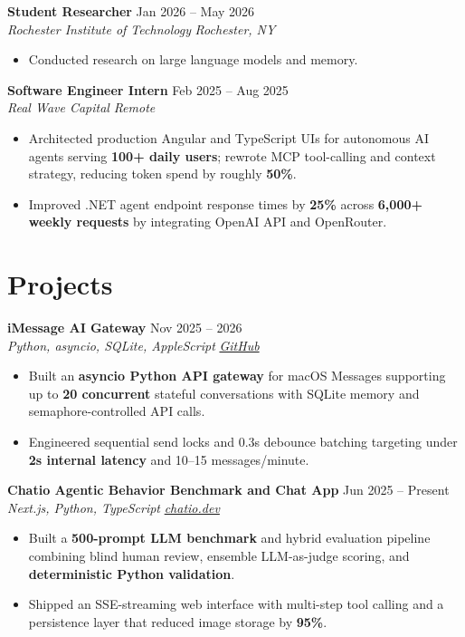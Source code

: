 \documentclass[10pt,letterpaper]{article}
\newcommand{\resumeRole}[4]{%
  \textbf{#1} \hfill #2\\
  \textit{#3} \hfill \textit{#4}
}
\newcommand{\majorGap}{\vspace{1pt plus 2fill}}
\newcommand{\entryGap}{\vspace{0pt plus 1fill}}
\begin{document}
\entryGap
\resumeRole{Student Researcher}{Jan 2026 -- May 2026}{Rochester Institute of Technology}{Rochester, NY}
\begin{itemize}
  \item Conducted research on large language models and memory.
\end{itemize}

\entryGap
\resumeRole{Software Engineer Intern}{Feb 2025 -- Aug 2025}{Real Wave Capital}{Remote}
\begin{itemize}
  \item Architected production Angular and TypeScript UIs for autonomous AI agents serving \textbf{100+ daily users}; rewrote MCP tool-calling and context strategy, reducing token spend by roughly \textbf{50\%}.
  \item Improved .NET agent endpoint response times by \textbf{25\%} across \textbf{6,000+ weekly requests} by integrating OpenAI API and OpenRouter.
\end{itemize}

\majorGap
\section*{Projects}
\resumeRole{iMessage AI Gateway}{Nov 2025 -- 2026}{Python, asyncio, SQLite, AppleScript}{\href{https://github.com/alextyhwang/iMessages-Chatbot-Server}{GitHub}}
\begin{itemize}
  \item Built an \textbf{asyncio Python API gateway} for macOS Messages supporting up to \textbf{20 concurrent} stateful conversations with SQLite memory and semaphore-controlled API calls.
  \item Engineered sequential send locks and 0.3s debounce batching targeting under \textbf{2s internal latency} and 10--15 messages/minute.
\end{itemize}

\entryGap
\resumeRole{Chatio Agentic Behavior Benchmark and Chat App}{Jun 2025 -- Present}{Next.js, Python, TypeScript}{\href{https://chatio.dev}{chatio.dev}}
\begin{itemize}
  \item Built a \textbf{500-prompt LLM benchmark} and hybrid evaluation pipeline combining blind human review, ensemble LLM-as-judge scoring, and \textbf{deterministic Python validation}.
  \item Shipped an SSE-streaming web interface with multi-step tool calling and a persistence layer that reduced image storage by \textbf{95\%}.
\end{itemize}
\end{document}
